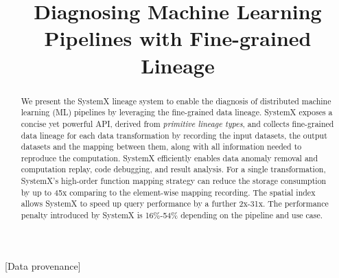 \documentclass{sig-alternate}
\begin{document}
\title{Diagnosing Machine Learning Pipelines with Fine-grained Lineage}


\maketitle

\begin{abstract}
We present the SystemX lineage system to enable the diagnosis of distributed machine learning (ML) pipelines by leveraging the fine-grained
data lineage.  
SystemX exposes a concise yet powerful API, derived from \emph{primitive lineage types}, and collects fine-grained data lineage for each 
data transformation by recording the input datasets, the output datasets and the mapping between them, along
with all information needed to reproduce the computation.
SystemX efficiently enables data anomaly removal and computation replay, code debugging, and result analysis.
For a single transformation, SystemX's high-order function mapping strategy can reduce the storage consumption by up to 
45x comparing to the element-wise mapping recording.
The spatial index allows SystemX to speed up query performance by a further 2x-31x. 
The performance penalty introduced by SystemX is 16\%-54\% depending on the pipeline and use case.
\end{abstract}

[Data provenance]
\end{document}
